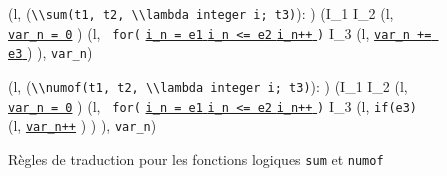 \begin{figure*}[bt]
  \scriptsize{
    {
      {
        \splitfrac
            {(l,
              (\mbox{\lstinline'\\sum(t1, t2, \\lambda integer i; t3)'}):
              )
              }
            {
              (I_1 \concat I_2
              \concat
              (l, \underline{\Zinit \mbox{\lstinline'var_n = 0'}} \semicolon )
              \concat
              (l, \mbox{\lstinline' for('}
              \underline{\Zinit \mbox{\lstinline'i_n = e1'} \Zclear}\semicolon
              \underline{\mbox{\lstinline'i_n <= e2'} \Zclear}\semicolon
              \underline{\mbox{\lstinline'i_n++'} \Zclear}
              \mbox{\lstinline')'} \bopen
              I_3
              \concat
              (l,
              \underline{\mbox{\lstinline'var_n += e3'} \Zclear}\semicolon )
              \bclose
              ),
              \mbox{\lstinline'var_n'})
            }
      }
    }

    {
      {
        \splitfrac
            {(l,
              (\mbox{\lstinline'\\numof(t1, t2, \\lambda integer i; t3)'}):
              )
              }
            {
              (I_1 \concat I_2
              \concat
              (l,
              \underline{\Zinit \mbox{\lstinline'var_n = 0'}}
              \semicolon )
              \concat
              (l, \mbox{\lstinline' for('}
              \underline{\Zinit \mbox{\lstinline'i_n = e1'} \Zclear}
              \semicolon
              \underline{\mbox{\lstinline'i_n <= e2'} \Zclear}
              \semicolon
              \underline{\mbox{\lstinline'i_n++'} \Zclear}
              \mbox{\lstinline')'} \bopen
              I_3
              \concat (l,
              \mbox{\lstinline'if(e3)'}
              \bopen
              (l, \underline{\mbox{\lstinline'var_n++'}} \semicolon)
              \bclose )
              \bclose
              ),
              \mbox{\lstinline'var_n'})
            }
      }
    }
  }
  \caption{Règles de traduction pour les fonctions logiques \lstinline'sum' et
    \lstinline'numof'}
  \label{fig:builtin}
\end{figure*}

